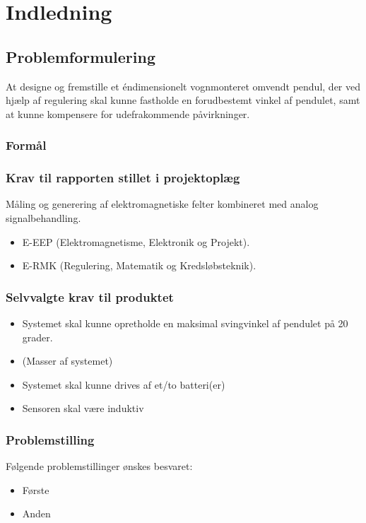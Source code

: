 \chapter{Indledning}

\section{Problemformulering}
At designe og fremstille et éndimensionelt vognmonteret omvendt pendul, der ved hjælp af regulering skal kunne fastholde en forudbestemt vinkel af pendulet, samt at kunne kompensere for udefrakommende påvirkninger. 

\subsection{Formål}

\subsection{Krav til rapporten stillet i projektoplæg}
Måling og generering af elektromagnetiske felter kombineret med analog signalbehandling.
\begin{itemize}
\item E-EEP (Elektromagnetisme, Elektronik og Projekt).
\item E-RMK (Regulering, Matematik og Kredsløbsteknik).
\end{itemize}

\subsection{Selvvalgte krav til produktet} \label{afs:kravspecifikation}
\begin{itemize}
\item Systemet skal kunne opretholde en maksimal svingvinkel af pendulet på 20 grader.
\item (Masser af systemet)
\item Systemet skal kunne drives af et/to batteri(er)
\item Sensoren skal være induktiv
\end{itemize}

\subsection{Problemstilling}
Følgende problemstillinger ønskes besvaret:
\begin{itemize}
\item Første
\item Anden
\end{itemize}

